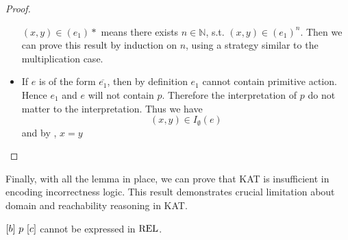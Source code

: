 \begin{proof}
\begin{itemize}
        \((x, y) ∈ (e_1)*\) means there exists \(n ∈ ℕ\),
        s.t. \((x, y) ∈ {(e_1)}^{n}\).
        Then we can prove this result by induction on \(n\), 
        using a strategy similar to the multiplication case.
        \item If \(e\) is of the form \(\overline{e_1}\),
        then by definition \(e_1\) cannot contain primitive action.
        Hence \(e_1\) and \(e\) will not contain \(p\).
        Therefore the interpretation of \(p\) do not matter to the interpretation.
        Thus we have \[(x, y) ∈ I_∅(e)\]
        and by , \(x = y\) \qedhere
    \end{itemize}
\end{proof}

Finally, with all the lemma in place, we can prove that KAT is insufficient in encoding incorrectness logic. 
This result demonstrates crucial limitation about domain and reachability reasoning in KAT.

\begin{theorem}\label{the: KAT not able to express incorrectness logic}
    \([b]~p~[c]\)
    cannot be expressed in \(\mathbf{\mathrm{REL}}\).
\end{theorem}

